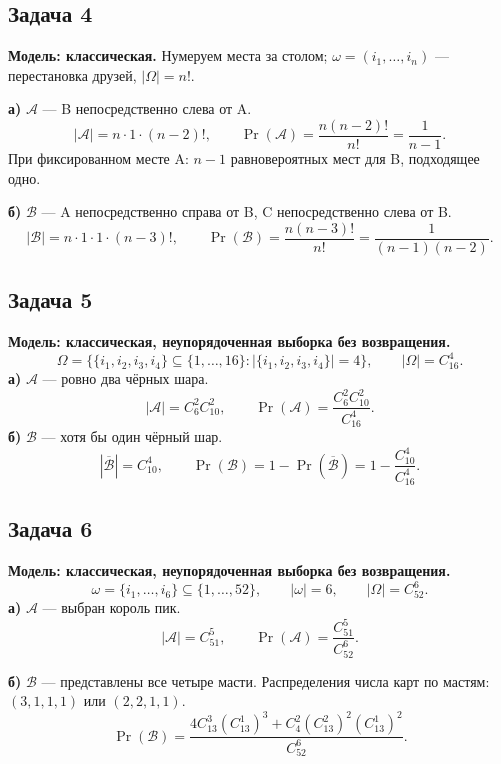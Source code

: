 \clearpage
\subsection{Задача 4}

\begin{solution}
    \textbf{Модель: классическая.}
    Нумеруем места за столом; $\omega=(i_1,\ldots,i_n)$ ---
    перестановка друзей, $|\Omega|=n!$.

    \textbf{а)} $\mathcal{A}$ --- B непосредственно слева от A.
    \[
        |\mathcal{A}|=n\cdot1\cdot(n-2)!,
        \qquad
        \Pr(\mathcal{A})=\frac{n(n-2)!}{n!}
        =\boxed{\frac1{n-1}}.
    \]
    При фиксированном месте A: $n-1$ равновероятных мест для B,
    подходящее одно.

    \textbf{б)} $\mathcal{B}$ --- A непосредственно справа от B,
    C непосредственно слева от B.
    \[
        |\mathcal{B}|=n\cdot1\cdot1\cdot(n-3)!,
        \qquad
        \Pr(\mathcal{B})=\frac{n(n-3)!}{n!}
        =\boxed{\frac1{(n-1)(n-2)}}.
    \]
\end{solution}

\subsection{Задача 5}

\begin{solution}
    \textbf{Модель: классическая, неупорядоченная выборка без возвращения.}
    \[
        \Omega=\bigl\{\{i_1,i_2,i_3,i_4\}\subseteq\{1,\ldots,16\}:
        |\{i_1,i_2,i_3,i_4\}|=4\bigr\},
        \qquad |\Omega|=C_{16}^4.
    \]
    \textbf{а)} $\mathcal{A}$ --- ровно два чёрных шара.
    \[
        |\mathcal{A}|=C_6^2C_{10}^2,\qquad
        \Pr(\mathcal{A})=\boxed{\frac{C_6^2C_{10}^2}{C_{16}^4}}.
    \]
    \textbf{б)} $\mathcal{B}$ --- хотя бы один чёрный шар.
    \[
        |\overline{\mathcal{B}}|=C_{10}^4,\qquad
        \Pr(\mathcal{B})=1-\Pr(\overline{\mathcal{B}})
        =\boxed{1-\frac{C_{10}^4}{C_{16}^4}}.
    \]
\end{solution}

\subsection{Задача 6}

\begin{solution}
    \textbf{Модель: классическая, неупорядоченная выборка без возвращения.}
    \[
        \omega=\{i_1,\ldots,i_6\}\subseteq\{1,\ldots,52\},
        \qquad |\omega|=6,\qquad |\Omega|=C_{52}^6.
    \]
    \textbf{а)} $\mathcal{A}$ --- выбран король пик.
    \[
        |\mathcal{A}|=C_{51}^5,\qquad
        \Pr(\mathcal{A})=\boxed{\frac{C_{51}^5}{C_{52}^6}}.
    \]

    \textbf{б)} $\mathcal{B}$ --- представлены все четыре масти.
    Распределения числа карт по мастям: $(3,1,1,1)$ или $(2,2,1,1)$.
    \[
        \Pr(\mathcal{B})
        =\boxed{\frac{4C_{13}^3(C_{13}^1)^3+
            C_4^2(C_{13}^2)^2(C_{13}^1)^2}{C_{52}^6}}.
    \]
\end{solution}
